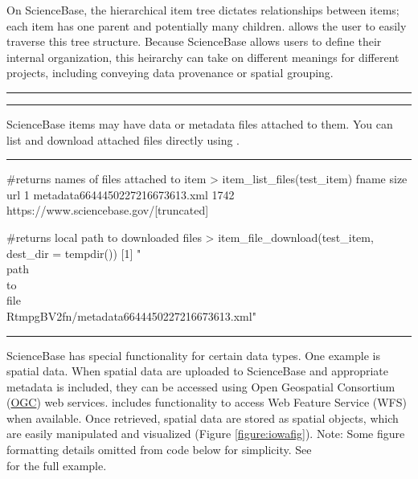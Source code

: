 On ScienceBase, the hierarchical item tree dictates relationships between items; 
each item has one parent and potentially many children.  allows the user to
easily traverse this tree structure. Because ScienceBase allows users to define their internal 
organization, this heirarchy can take on different meanings for different projects, including 
conveying data provenance or spatial grouping.


\noindent\rule{\textwidth}{0.4pt}
\noindent\rule{\textwidth}{0.4pt}

ScienceBase items may have data or metadata files attached to them.
You can list and download attached files directly using .

\noindent\rule{\textwidth}{0.4pt}
\begin{example}
#returns names of files attached to item
> item_list_files(test_item)
                              fname size  url
  1 metadata6644450227216673613.xml 1742  https://www.sciencebase.gov/[truncated]

#returns local path to downloaded files
> item_file_download(test_item, dest_dir = tempdir())
[1] "\\path\\to\\file\\RtmpgBV2fn/metadata6644450227216673613.xml"
\end{example}
\noindent\rule{\textwidth}{0.4pt}

ScienceBase has special functionality for certain data types.
One example is spatial data. When spatial data are uploaded to ScienceBase 
and appropriate metadata is included, they can be accessed using 
Open Geospatial Consortium (\href{http://www.opengeospatial.org/}{OGC}) 
web services.  includes functionality to access Web
Feature Service (WFS) when available. Once retrieved, spatial data are stored 
as  spatial objects, which are easily manipulated and visualized (Figure \ref{figure:iowafig}). 
Note: Some figure formatting details 
omitted from code below for simplicity. See \\
for the full example.

